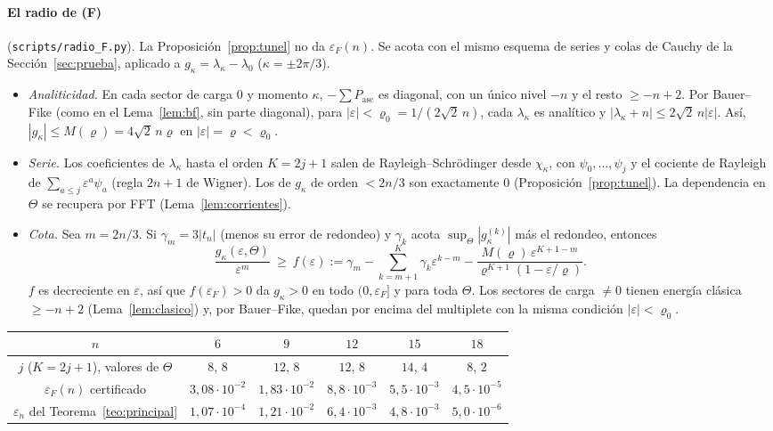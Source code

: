 \documentclass[11pt,a4paper]{article}
\theoremstyle{definition}
\theoremstyle{remark}
\newcommand{\Pasc}{P_{\mathrm{asc}}}
\newcommand{\eps}{\varepsilon}
\newcommand{\scr}[1]{\texttt{scripts/#1}}
\begin{document}
\paragraph{El radio de (F)} (\scr{radio\_F.py}). La Proposición~\ref{prop:tunel} no da $\eps_F(n)$. Se
acota con el mismo esquema de series y colas de Cauchy de la Sección~\ref{sec:prueba}, aplicado a
$g_\kappa=\lambda_\kappa-\lambda_0$ ($\kappa=\pm2\pi/3$).
\begin{itemize}
\item \emph{Analiticidad.} En cada sector de carga $0$ y momento $\kappa$, $-\sum\Pasc$ es diagonal, con un único
  nivel $-n$ y el resto $\ge-n+2$. Por Bauer--Fike (como en el Lema~\ref{lem:bf}, sin parte diagonal),
  para $|\eps|<\varrho_0=1/(2\sqrt2\,n)$, cada $\lambda_\kappa$ es analítico y $|\lambda_\kappa+n|\le2\sqrt2\,n|\eps|$.
  Así, $|g_\kappa|\le M(\varrho)=4\sqrt2\,n\varrho$ en $|\eps|=\varrho<\varrho_0$.
\item \emph{Serie.} Los coeficientes de $\lambda_\kappa$ hasta el orden $K=2j+1$ salen de
  Rayleigh--Schrödinger desde $\chi_\kappa$, con $\psi_0,\dots,\psi_j$ y el cociente de Rayleigh de
  $\sum_{a\le j}\eps^a\psi_a$ (regla $2n+1$ de Wigner). Los de $g_\kappa$ de orden $<2n/3$ son exactamente $0$
  (Proposición~\ref{prop:tunel}). La dependencia en $\Theta$ se recupera por FFT
  (Lema~\ref{lem:corrientes}).
\item \emph{Cota.} Sea $m=2n/3$. Si $\gamma_m=3|t_n|$ (menos su error de redondeo) y $\gamma_k$ acota
  $\sup_\Theta|g_\kappa^{(k)}|$ más el redondeo, entonces
  \[
    \frac{g_\kappa(\eps,\Theta)}{\eps^m}\ \ge\ f(\eps):=\gamma_m-\sum_{k=m+1}^{K}\gamma_k\eps^{k-m}
    -\frac{M(\varrho)\,\eps^{K+1-m}}{\varrho^{K+1}(1-\eps/\varrho)} .
  \]
  $f$ es decreciente en $\eps$, así que $f(\eps_F)>0$ da $g_\kappa>0$ en todo $(0,\eps_F]$ y para toda
  $\Theta$. Los sectores de carga $\ne0$ tienen energía clásica $\ge-n+2$ (Lema~\ref{lem:clasico}) y, por
  Bauer--Fike, quedan por encima del multiplete con la misma condición $|\eps|<\varrho_0$.
\end{itemize}

\begin{center}
\begin{tabular}{cccccc}
\toprule
$n$ & $6$ & $9$ & $12$ & $15$ & $18$\\
\midrule
$j$ ($K=2j+1$), valores de $\Theta$ & $8$, $8$ & $12$, $8$ & $12$, $8$ & $14$, $4$ & $8$, $2$\\
$\eps_F(n)$ certificado & $3{,}08\cdot10^{-2}$ & $1{,}83\cdot10^{-2}$ & $8{,}8\cdot10^{-3}$ & $5{,}5\cdot10^{-3}$ & $4{,}5\cdot10^{-5}$\\
$\eps_n$ del Teorema~\ref{teo:principal} & $1{,}07\cdot10^{-4}$ & $1{,}21\cdot10^{-2}$ & $6{,}4\cdot10^{-3}$ & $4{,}8\cdot10^{-3}$ & $5{,}0\cdot10^{-6}$\\
\bottomrule
\end{tabular}
\end{center}
\end{document}
